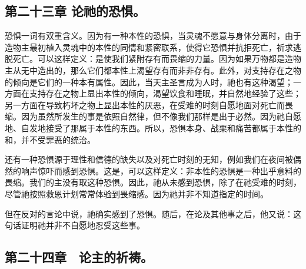 
\subsection{第二十三章 论祂的恐惧。}

恐惧一词有双重含义。因为有一种本性的恐惧，当灵魂不愿意与身体分离时，由于造物主最初植入灵魂中的本性的同情和紧密联系，使得它恐惧并抗拒死亡，祈求逃脱死亡。可以这样定义：是使我们紧附存有而畏缩的力量。因为如果万物都是造物主从无中造出的，那么它们都本性上渴望存有而非非存有。此外，对支持存在之物的倾向是它们的一种本有属性。因此，当天主圣言成为人时，祂也有这种渴望；一方面在支持存在之物上显出本性的倾向，渴望饮食和睡眠，并自然地经验了这些；另一方面在导致朽坏之物上显出本性的厌恶，在受难的时刻自愿地面对死亡而畏缩。因为虽然所发生的事是依照自然律，但不像我们那样是出于必然。因为祂自愿地、自发地接受了那属于本性的东西。所以，恐惧本身、战栗和痛苦都属于本性的和，并不受罪恶的统治。\par

还有一种恐惧源于理性和信德的缺失以及对死亡时刻的无知，例如我们在夜间被偶然的响声惊吓而感到恐惧。这是，可以这样定义：非本性的恐惧是一种出乎意料的畏缩。我们的主没有取这种恐惧。因此，祂从未感到恐惧，除了在祂受难的时刻，尽管祂按照救恩计划常常体验到畏缩感。因为祂并非不知道指定的时间。\par

但在反对的言论中说，祂确实感到了恐惧。随后，在论及其他事之后，他又说：这句话证明祂并非不自愿地忍受这些事。\par


\subsection{第二十四章　论主的祈祷。}

